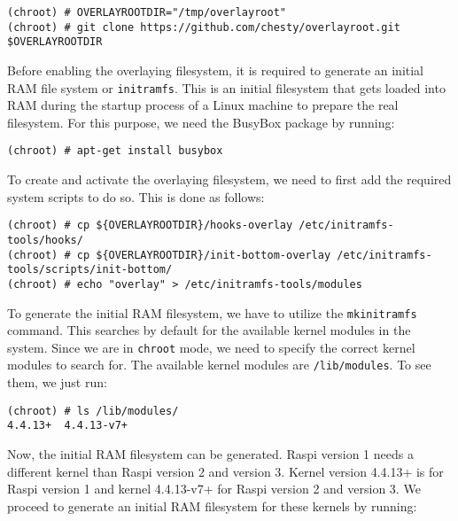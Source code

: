 \begin{lstlisting}[]
(chroot) # OVERLAYROOTDIR="/tmp/overlayroot"
(chroot) # git clone https://github.com/chesty/overlayroot.git $OVERLAYROOTDIR
\end{lstlisting}
\FloatBarrier
\vspace{-5mm}

Before enabling the overlaying filesystem, it is required to generate
an initial \ac{RAM} file system or \texttt{initramfs}. This is an
initial filesystem that gets loaded into \ac{RAM} during the startup
process of a Linux machine to prepare the real filesystem. For this purpose,
we need the BusyBox package by running:

\begin{lstlisting}[]
(chroot) # apt-get install busybox
\end{lstlisting}
\FloatBarrier
\vspace{-5mm}

To create and activate the overlaying filesystem, we need to first
add the required system scripts to do so. This is done as follows:

\begin{lstlisting}[]
(chroot) # cp ${OVERLAYROOTDIR}/hooks-overlay /etc/initramfs-tools/hooks/
(chroot) # cp ${OVERLAYROOTDIR}/init-bottom-overlay /etc/initramfs-tools/scripts/init-bottom/
(chroot) # echo "overlay" > /etc/initramfs-tools/modules
\end{lstlisting}
\FloatBarrier
\vspace{-5mm}

To generate the initial \ac{RAM} filesystem, we have to utilize the
\texttt{mkinitramfs} command. This searches by default for the available
kernel modules in the system. Since we are in \texttt{chroot} mode, we need
to specify the correct kernel modules to search for. The available
kernel modules are \texttt{/lib/modules}. To see them, we just run:

\begin{lstlisting}[]
(chroot) # ls /lib/modules/
4.4.13+  4.4.13-v7+
\end{lstlisting}
\FloatBarrier
\vspace{-5mm}

Now, the initial \ac{RAM} filesystem can be generated. \ac{Raspi} version 1
needs a different kernel than \ac{Raspi} version 2 and version 3. Kernel
version 4.4.13+ is for \ac{Raspi} version 1 and kernel 4.4.13-v7+ for
\ac{Raspi} version 2 and version 3. We proceed to generate an initial
\ac{RAM} filesystem for these kernels by running:


